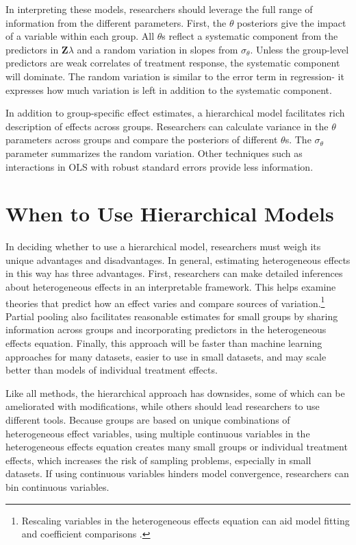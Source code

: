 \documentclass[12pt]{article}
\begin{document}
In interpreting these models, researchers should leverage the full range of information from the different parameters. 
First, the $\theta$ posteriors give the impact of a variable within each group.
All $\theta$s reflect a systematic component from the predictors in \textbf{Z}$\lambda$ and a random variation in slopes from $\sigma_\theta$. 
Unless the group-level predictors are weak correlates of treatment response, the systematic component will dominate. 
The random variation is similar to the error term in regression- it expresses how much variation is left in addition to the systematic component. 


In addition to group-specific effect estimates, a hierarchical model facilitates rich description of effects across groups. 
Researchers can calculate variance in the $\theta$ parameters across groups and compare the posteriors of different $\theta$s. 
The $\sigma_\theta$ parameter summarizes the random variation. 
Other techniques such as interactions in OLS with robust standard errors provide less information.


\section{When to Use Hierarchical Models}

In deciding whether to use a hierarchical model, researchers must weigh its unique advantages and disadvantages. 
In general, estimating heterogeneous effects in this way has three advantages.
First, researchers can make detailed inferences about heterogeneous effects in an interpretable framework. 
This helps examine theories that predict how an effect varies and compare sources of variation.\footnote{Rescaling variables in the heterogeneous effects equation can aid model fitting and coefficient comparisons \citep{Gelman2008}.} 
Partial pooling also facilitates reasonable estimates for small groups by sharing information across groups and incorporating predictors in the heterogeneous effects equation. 
Finally, this approach will be faster than machine learning approaches for many datasets, easier to use in small datasets, and may scale better than models of individual treatment effects.


Like all methods, the hierarchical approach has downsides, some of which can be ameliorated with modifications, while others should lead researchers to use different tools. 
Because groups are based on unique combinations of heterogeneous effect variables, using multiple continuous variables in the heterogeneous effects equation creates many small groups or individual treatment effects, which increases the risk of sampling problems, especially in small datasets. 
If using continuous variables hinders model convergence, researchers can bin continuous variables.
\end{document}
